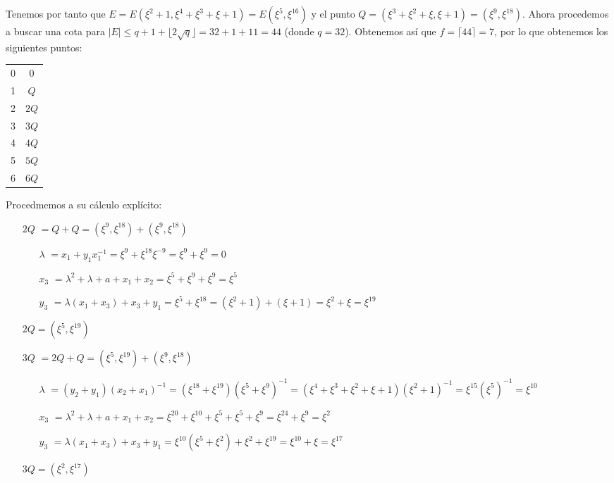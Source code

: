 \documentclass[fleqn]{article}
\begin{document}
    Tenemos por tanto que $E = E(\xi^2 + 1, \xi^4 + \xi^3 + \xi + 1) = E(\xi^5, \xi^{16})$ y  el punto $Q = (\xi^3 + \xi^2 + \xi, \xi + 1) = 
    (\xi^9, \xi^{18})$. Ahora procedemos a buscar una cota para $|E| \leq q + 1 + \lfloor 2 \sqrt{q} \rfloor = 32 + 1 + 11 = 44$ (donde $q = 32$).
    Obtenemos así que $f = \lceil 44 \rceil = 7$, por lo que obtenemos los siguientes puntos:
    \begin{center}
        \begin{tabular}{| c | c |}
            \hline
            0 & 0 \\
            1 & $Q$ \\
            2 & $2Q$ \\
            3 & $3Q$ \\
            4 & $4Q$ \\
            5 & $5Q$ \\
            6 & $6Q$ \\ \hline
        \end{tabular}
    \end{center}

    Procedmemos a su cálculo explícito:

    \begin{itemize}
        \item[$2Q$] $ = Q + Q = (\xi^9, \xi^{18}) + (\xi^9, \xi^{18})$
                    \begin{itemize}
                        \item[$\lambda$] $ = x_1 + y_1 x_1^{-1} = \xi^9 + \xi^{18} \xi^{-9} = \xi^9 + \xi^9 = 0$
                        \item[$x_3$] $ = \lambda^2 + \lambda + a + x_1 + x_2 = \xi^5 + \xi^9 + \xi^{9} = \xi^{5}$
                        \item[$y_3$] $ = \lambda(x_1 + x_3) + x_3 + y_1 = \xi^{5} + \xi^{18} = (\xi^2 + 1) + (\xi + 1) = \xi^2 + \xi = \xi^{19}$
                    \end{itemize}
                    $2Q = (\xi^{5}, \xi^{19})$
        \item[$3Q$] $ = 2Q + Q = (\xi^{5}, \xi^{19}) + (\xi^9, \xi^{18})$
                    \begin{itemize}
                        \item[$\lambda$] $ = (y_2 + y_1)(x_2 + x_1)^{-1} = (\xi^{18} + \xi^{19})(\xi^{5} + \xi^{9})^{-1} = (\xi^4 + \xi^3 + \xi^2 + \xi + 1)(\xi^2 + 1)^{-1} = \xi^{15} (\xi^{5})^{-1} = \xi^{10}$
                        \item[$x_3$] $ = \lambda^2 + \lambda + a + x_1 + x_2 = \xi^{20} + \xi^{10} + \xi^{5} + \xi^{5} + \xi^{9} = \xi^{24} + \xi^9 = \xi^2$
                        \item[$y_3$] $ = \lambda(x_1 + x_3) + x_3 + y_1 = \xi^{10}(\xi^5 + \xi^2) + \xi^2 + \xi^{19} = \xi^{10} + \xi = \xi^{17}$
                    \end{itemize}
                    $3Q = (\xi^{2}, \xi^{17})$
    \end{itemize}
\end{document}
